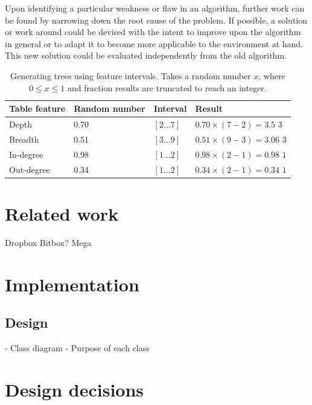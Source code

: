 \documentclass[10pt, titlepage]{article}
\begin{document}
Upon identifying a particular weakness or flaw in an algorithm, further work can be found by narrowing down the root cause of the problem. If possible, a solution or work around could be devised with the intent to improve upon the algorithm in general or to adapt it to become more applicable to the environment at hand. This new solution could be evaluated independently from the old algorithm.

\begin{center}
\begin{table}
    \begin{tabular}{ | l | l | l | p{5cm} |}
    \hline
    Table feature & Random number & Interval & Result \\ \hline
    Depth & 0.70 & $[2 \dots 7]$ & $0.70 \times (7-2) = 3.5$ \newline \textbf{$3$} \\ \hline
    Breadth & 0.51 & $[3 \dots 9]$ & $0.51 \times (9-3) = 3.06$ \newline \textbf{$3$} \\ \hline
    In-degree & 0.98 & $[1 \dots 2]$ & $0.98 \times (2-1) = 0.98$ \newline \textbf{$1$} \\ \hline
    Out-degree & 0.34 & $[1 \dots 2]$ & $0.34 \times (2-1) = 0.34$ \newline \textbf{$1$} \\ \hline 
    \end{tabular}
    \caption{Generating trees using feature intervals. Takes a random number $x$, where $0≤x≤1$ and fraction results are truncated to reach an integer.} \label{tab:graphGenerator}
    \end{table}
\end{center}

\section{Related work}
Dropbox
Bitbox?
Mega

\section{Implementation}
\subsection{Design}
- Class diagram
- Purpose of each class

\section{Design decisions}
\end{document}
